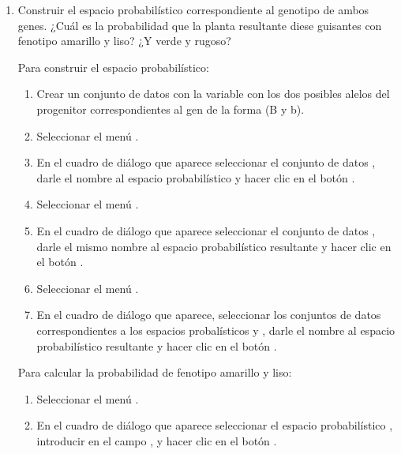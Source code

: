 \begin{enumerate}[leftmargin=*]
{\begin{enumerate}
\item Construir el espacio probabilístico correspondiente al genotipo de ambos genes. 
¿Cuál es la probabilidad que la planta resultante diese guisantes con fenotipo amarillo y liso? 
¿Y verde y rugoso?
\begin{indicacion}
Para construir el espacio probabilístico: 
\begin{enumerate}
\item Crear un conjunto de datos  con la variable  con los dos posibles alelos del
progenitor correspondientes al gen de la forma (B y b).
\item Seleccionar el menú .
\item En el cuadro de diálogo que aparece seleccionar el conjunto de datos , darle el nombre
 al espacio probabilístico y hacer clic en el botón .
\item Seleccionar el menú .
\item En el cuadro de diálogo que aparece seleccionar el conjunto de datos , darle el mismo nombre al espacio
probabilístico resultante y hacer clic en el botón . 
\item Seleccionar el menú .
\item En el cuadro de diálogo que aparece, seleccionar los conjuntos de datos correspondientes a los espacios probalísticos
 y ,  darle el nombre  al espacio
probabilístico resultante y hacer clic en el botón .
\end{enumerate}
Para calcular la probabilidad de fenotipo amarillo y liso:
\begin{enumerate}
\item Seleccionar el menú .
\item En el cuadro de diálogo que aparece seleccionar el espacio probabilístico , introducir
 en el campo , y hacer clic en el botón .

\end{enumerate}
\end{indicacion}
\end{enumerate}}
\end{enumerate}
